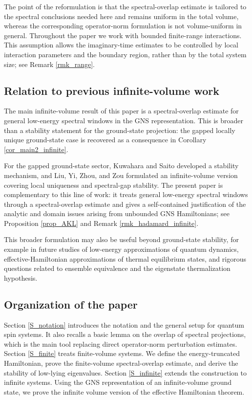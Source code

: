 \documentclass[11pt]{article}
\numberwithin{equation}{section}
\begin{document}
The point of the reformulation is that the spectral-overlap estimate is tailored to the spectral conclusions needed here and remains uniform in the total volume, whereas the corresponding operator-norm formulation is not volume-uniform in general. Throughout the paper we work with bounded finite-range interactions. This assumption allows the imaginary-time estimates to be controlled by local interaction parameters and the boundary region, rather than by the total system size; see Remark \ref{rmk_range}.

\subsection{Relation to previous infinite-volume work}

The main infinite-volume result of this paper is a spectral-overlap estimate for general low-energy spectral windows in the GNS representation. This is broader than a stability statement for the ground-state projection: the gapped locally unique ground-state case is recovered as a consequence in Corollary \ref{cor_main2_infinite}.

For the gapped ground-state sector, Kuwahara and Saito \cite{Kuwahara-Saito2020} developed a stability mechanism, and Liu, Yi, Zhou, and Zou \cite{Liu-Yi-Zhou-Zou2025} formulated an infinite-volume version covering local uniqueness and spectral-gap stability. The present paper is complementary to this line of work: it treats general low-energy spectral windows through a spectral-overlap estimate and gives a self-contained justification of the analytic and domain issues arising from unbounded GNS Hamiltonians; see Proposition \ref{prop_AKL} and Remark \ref{rmk_hadamard_infinite}.

This broader formulation may also be useful beyond ground-state stability, for example in future studies of low-energy approximations of quantum dynamics, effective-Hamiltonian approximations of thermal equilibrium states, and rigorous questions related to ensemble equivalence and the eigenstate thermalization hypothesis.

\subsection{Organization of the paper}
Section \ref{S_notation} introduces the notation and the general setup for quantum spin systems. It also recalls a basic lemma on the overlap of spectral projections, which is the main tool replacing direct operator-norm perturbation estimates. Section \ref{S_finite} treats finite-volume systems. We define the energy-truncated Hamiltonian, prove the finite-volume spectral-overlap estimate, and derive the stability of low-lying eigenvalues. Section \ref{S_infinite} extends the construction to infinite systems. Using the GNS representation of an infinite-volume ground state, we prove the infinite volume version of the effective Hamiltonian theorem.
\end{document}
